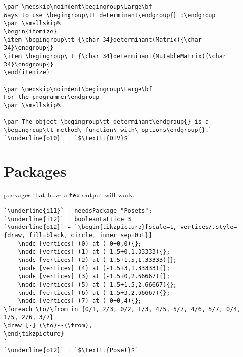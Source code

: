 \documentclass[12pt,a4paper]{amsart}
\begin{document}
\begin{lstlisting}[language=Macaulay2]
\par \medskip\noindent\begingroup\Large\bf
Ways to use \begingroup\tt determinant\endgroup{} :\endgroup
\par \smallskip%
\begin{itemize}
\item \begingroup\tt {\char 34}determinant(Matrix){\char 34}\endgroup{}
\item \begingroup\tt {\char 34}determinant(MutableMatrix){\char 34}\endgroup{}
\end{itemize}

\par \medskip\noindent\begingroup\Large\bf
For the programmer\endgroup
\par \smallskip%

\par The object \begingroup\tt determinant\endgroup{} is a \begingroup\tt method\ function\ with\ options\endgroup{}.`
`\underline{o10}` : `$\texttt{DIV}$`\end{lstlisting}

\section{Packages}
packages that have a {\tt tex} output will work:
\begin{lstlisting}[language=Macaulay2]
`\underline{i11}` : needsPackage "Posets";
`\underline{i12}` : booleanLattice 3
`\underline{o12}` = `\begin{tikzpicture}[scale=1, vertices/.style={draw, fill=black, circle, inner sep=0pt}]
	\node [vertices] (0) at (-0+0,0){};
	\node [vertices] (1) at (-1.5+0,1.33333){};
	\node [vertices] (2) at (-1.5+1.5,1.33333){};
	\node [vertices] (4) at (-1.5+3,1.33333){};
	\node [vertices] (3) at (-1.5+0,2.66667){};
	\node [vertices] (5) at (-1.5+1.5,2.66667){};
	\node [vertices] (6) at (-1.5+3,2.66667){};
	\node [vertices] (7) at (-0+0,4){};
\foreach \to/\from in {0/1, 2/3, 0/2, 1/3, 4/5, 6/7, 4/6, 5/7, 0/4, 1/5, 2/6, 3/7}
\draw [-] (\to)--(\from);
\end{tikzpicture}
`
`\underline{o12}` : `$\texttt{Poset}$`\end{lstlisting}
\end{document}
